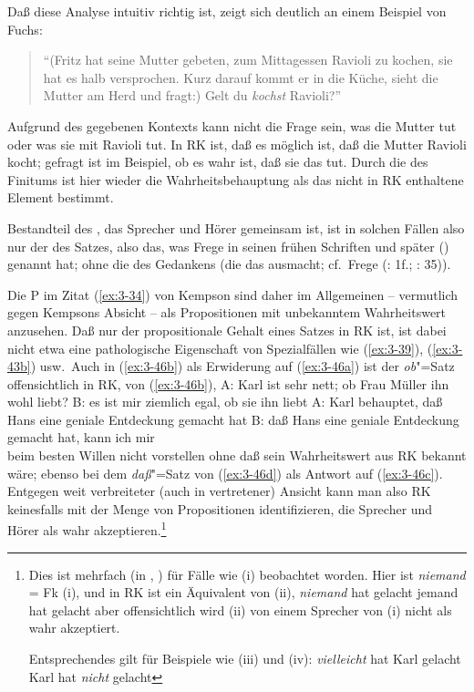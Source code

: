 \documentclass[output=paper]{langsci/langscibook}
\begin{document}
Daß diese Analyse intuitiv richtig ist, zeigt sich deutlich an einem Beispiel von Fuchs:
\begin{quotation}
  "`(Fritz hat seine Mutter gebeten, zum Mittagessen Ravioli zu kochen,
  sie hat es halb versprochen. Kurz darauf kommt er in die Küche,
  sieht die Mutter am Herd und fragt:) Gelt du \textit{kochst} Ravioli?"'
  \citep[309 (25)]{Fuchs76}
\end{quotation}
Aufgrund des gegebenen Kontexts kann nicht die Frage sein, was die
Mutter tut oder was sie mit Ravioli tut. In RK ist, daß es möglich
ist, daß die Mutter Ravioli kocht; gefragt ist im Beispiel, ob es wahr
ist, daß sie das tut. Durch die  des Finitums ist hier wieder
die Wahrheitsbehauptung als das nicht in RK enthaltene Element
bestimmt.

Bestandteil des , das Sprecher und Hörer gemeinsam
ist, ist in solchen Fällen also nur der 
des Satzes, also das, was Frege in seinen frühen Schriften
 \citep[2--5]{Frege1879} und später
 (\zb \citealt[32]{Frege1892}) genannt hat; ohne
die  des Gedankens (die das
 ausmacht; cf.\ \zb Frege (\citeyear{Frege1879}: 1f.;
\citeyear{Frege1892}: 35)).

Die P im Zitat (\ref{ex:3-34}) von Kempson sind daher im Allgemeinen -- vermutlich gegen
Kempsons Absicht -- als Propositionen mit unbekanntem Wahrheitswert anzusehen. Daß nur der propositionale Gehalt eines Satzes in RK ist, ist dabei nicht etwa eine pathologische Eigenschaft von Spezialfällen wie (\ref{ex:3-39}), (\ref{ex:3-43b}) usw.\ Auch \zb in (\ref{ex:3-46b}) als Erwiderung auf (\ref{ex:3-46a}) ist der \textit{ob}"=Satz offensichtlich in RK, \dash {} von (\ref{ex:3-46b}),
\eal \label{ex:3-46}
\ex
\label{ex:3-46a}
A: Karl ist sehr nett; ob Frau Müller ihn wohl liebt?
\ex
\label{ex:3-46b}
B: es ist mir ziemlich egal, ob sie ihn liebt
\ex
\label{ex:3-46c}
A: Karl behauptet, daß Hans eine geniale Entdeckung gemacht hat
\ex
\label{ex:3-46d}
B: daß Hans eine geniale Entdeckung gemacht hat, kann ich mir\\
\hspace{1em}beim besten Willen nicht vorstellen
\zl
ohne daß sein Wahrheitswert aus RK bekannt wäre; ebenso bei dem
\textit{daß}"=Satz von (\ref{ex:3-46d}) als Antwort auf (\ref{ex:3-46c}). Entgegen weit verbreiteter
(\zb auch in \citet{Clark77} vertretener) Ansicht kann man also RK keinesfalls mit der Menge von
Propositionen identifizieren, die Sprecher und Hörer als wahr akzeptieren.\footnote{\label{fn:3-13}%
  Dies ist mehrfach (\zb in \citet[246]{Jackendoff72}, \citet[98]{Rochemont78}) für Fälle wie (i)
  beobachtet worden. Hier ist \textit{niemand} = Fk (i), und in RK ist ein Äquivalent von (ii),
  \ea%
  \label{ex:3-fn13i}
  \textit{niemand} hat gelacht
  \ex
  \label{ex:3-fn13ii}
  jemand hat gelacht
  \z
  aber offensichtlich wird (ii) von einem Sprecher von (i) nicht als
  wahr akzeptiert.

  Entsprechendes gilt für Beispiele wie (iii) und (iv):
  \ea%
  \label{ex:3-fn13iii}
  \textit{vielleicht} hat Karl gelacht
  \ex
  \label{ex:3-fn13iv}
  Karl hat \textit{nicht} gelacht
  \zlast %
}
\end{document}
